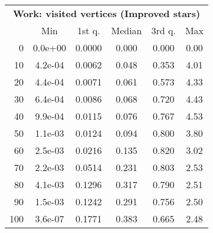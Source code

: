 \begin{tabular}{r|ccccc}
  \multicolumn{6}{c}{{\bf Work: visited vertices (Improved stars)}} \\
  & Min & 1st q. & Median & 3rd q. & Max \\ \hline\hline
  0 & 0.0e+00 & 0.0000 & 0.000 & 0.000 & 0.00
\\ 10 & 4.2e-04 & 0.0062 & 0.048 & 0.353 & 4.01
\\ 20 & 4.4e-04 & 0.0071 & 0.061 & 0.573 & 4.33
\\ 30 & 6.4e-04 & 0.0086 & 0.068 & 0.720 & 4.43
\\ 40 & 9.9e-04 & 0.0115 & 0.076 & 0.767 & 4.53
\\ 50 & 1.1e-03 & 0.0124 & 0.094 & 0.800 & 3.80
\\ 60 & 2.5e-03 & 0.0216 & 0.135 & 0.820 & 3.02
\\ 70 & 2.2e-03 & 0.0514 & 0.231 & 0.803 & 2.53
\\ 80 & 4.1e-03 & 0.1296 & 0.317 & 0.790 & 2.51
\\ 90 & 1.5e-03 & 0.1242 & 0.291 & 0.756 & 2.50
\\ 100 & 3.6e-07 & 0.1771 & 0.383 & 0.665 & 2.48
\end{tabular}
